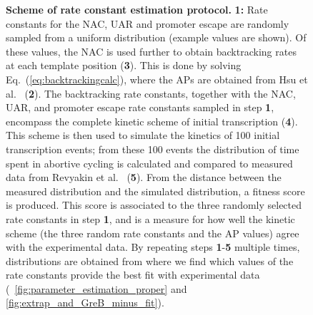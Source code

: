\begin{figure}[h]
  \caption{ {\bf Scheme of rate constant estimation protocol.} \textbf{1:}
    Rate constants for the NAC, UAR and promoter escape are randomly sampled
    from a uniform distribution (example values are shown). Of these values,
    the NAC is used further to obtain backtracking rates at each template
    position (\textbf{3}). This is done by solving
    Eq.~(\ref{eq:backtrackingcalc}), where the APs are obtained from Hsu et
    al.\ \cite{hsu_initial_2006} (\textbf{2}). The backtracking rate
    constants, together with the NAC, UAR, and promoter escape rate constants
    sampled in step \textbf{1}, encompass the complete kinetic scheme of
    initial transcription (\textbf{4}). This scheme is then used to simulate
    the kinetics of 100 initial transcription events; from these 100 events
    the distribution of time spent in abortive cycling is calculated and
    compared to measured data from Revyakin et al.\
    \cite{revyakin_abortive_2006} (\textbf{5}). From the distance between the
    measured distribution and the simulated distribution, a fitness score is
    produced. This score is associated to the three randomly selected rate
    constants in step \textbf{1}, and is a measure for how well the kinetic
    scheme (the three random rate constants and the AP values) agree with the
    experimental data. By repeating steps \textbf{1}-\textbf{5} multiple
    times, distributions are obtained from where we find which values of the
    rate constants provide the best fit with experimental data
    (\FIGS~\ref{fig:parameter_estimation_proper} and
    \ref{fig:extrap_and_GreB_minus_fit}). }
\end{figure}
